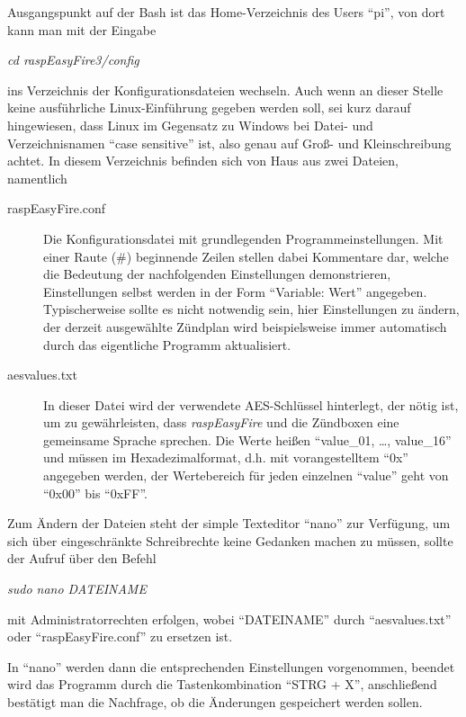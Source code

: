 \documentclass[paper=a4, parskip, numbers=noenddot, toc=listof, headsepline]{scrbook}
\newcommand{\REF}{\emph{raspEasyFire}}
\begin{document}
			Ausgangspunkt auf der Bash ist das Home-Verzeichnis des Users \enquote{pi}, von dort kann man mit der Eingabe
			\begin{center}
				\emph{cd raspEasyFire3/config}
			\end{center}
			ins Verzeichnis der Konfigurationsdateien wechseln. Auch wenn an dieser Stelle keine ausführliche Linux-Einführung gegeben werden soll, sei kurz darauf hingewiesen, dass Linux im Gegensatz zu Windows bei Datei- und Verzeichnisnamen \enquote{case sensitive} ist, also genau auf Groß- und Kleinschreibung achtet. In diesem Verzeichnis befinden sich von Haus aus zwei Dateien, namentlich
			\begin{description}
				\item[raspEasyFire.conf] Die Konfigurationsdatei mit grundlegenden Programmeinstellungen. Mit einer Raute (\#) beginnende Zeilen stellen dabei Kommentare dar, welche die Bedeutung der nachfolgenden Einstellungen demonstrieren, Einstellungen selbst werden in der Form \enquote{Variable: Wert} angegeben. Typischerweise sollte es nicht notwendig sein, hier Einstellungen zu ändern, der derzeit ausgewählte Zündplan wird beispielsweise immer automatisch durch das eigentliche Programm aktualisiert.
				\item[aesvalues.txt] In dieser Datei wird der verwendete AES-Schlüssel hinterlegt, der nötig ist, um zu gewährleisten, dass {\REF} und die Zündboxen eine gemeinsame Sprache sprechen. Die Werte heißen \enquote{value\_01, \dots, value\_16} und müssen im Hexadezimalformat, d.h. mit vorangestelltem \enquote{0x} angegeben werden, der Wertebereich für jeden einzelnen \enquote{value} geht von \enquote{0x00} bis \enquote{0xFF}.
			\end{description}

			Zum Ändern der Dateien steht der simple Texteditor \enquote{nano} zur Verfügung, um sich über eingeschränkte Schreibrechte keine Gedanken machen zu müssen, sollte der Aufruf über den Befehl
			\begin{center}
				\emph{sudo nano DATEINAME}
			\end{center}
			mit Administratorrechten erfolgen, wobei \enquote{DATEINAME} durch \enquote{aesvalues.txt} oder \enquote{raspEasyFire.conf} zu ersetzen ist.

			In \enquote{nano} werden dann die entsprechenden Einstellungen vorgenommen, beendet wird das Programm durch die Tastenkombination \enquote{STRG + X}, anschließend bestätigt man die Nachfrage, ob die Änderungen gespeichert werden sollen.
\end{document}
